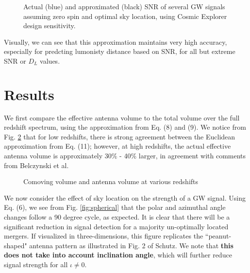 \documentclass{article}
\begin{document}
\begin{figure}[!htb]
    \caption{\label{fig:approx} Actual (blue) and approximated (black) SNR of several GW signals assuming zero spin and optimal sky location, using Cosmic Explorer design sensitivity.}
\end{figure}

Visually, we can see that this approximation maintains very high accuracy, especially for predcting lumonisty distance based on SNR, for all but extreme SNR or $D_L$ values. 

\section{Results}

We first compare the effective antenna volume to the total volume over the full redshift spectrum, using the approximation from Eq. (8) and (9). We notice from Fig. \ref{fig:antenna} that for low redshifts, there is strong agreement between the Euclidean approximation from Eq. (11); however, at high redshifts, the actual effective antenna volume is approximately 30\% - 40\% larger, in agreement with comments from Belczynski et al. 

\begin{figure}[!htb]
    \caption{\label{fig:antenna} Comoving volume and antenna volume at various redshifts}
\end{figure}

We now consider the effect of sky location on the strength of a GW signal. Using Eq. (6), we see from Fig. \ref{fig:spherical} that the polar and azimuthal angle changes follow a 90 degree cycle, as expected. It is clear that there will be a significant reduction in signal detection for a majority un-optimally located mergers. If visualized in three-dimensions, this figure replicates the ``peanut-shaped" antenna pattern as illustrated in Fig. 2 of Schutz. We note that \textbf{this does not take into account inclination angle}, which will further reduce signal strength for all $\iota \neq 0$. 
\end{document}
